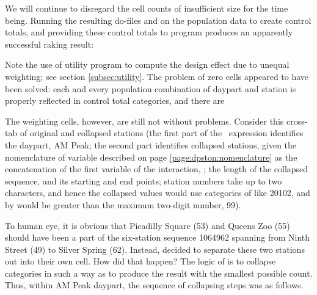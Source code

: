 We will continue to disregard the cell counts of insufficient size for the time being.
Running the resulting do-files  and 
on the population data to create control totals, and providing these control totals
to  program produces an apparently successful raking result:

\noindent
\begin{stlog}
\nullskip
\end{stlog}

Note the use of utility program  to compute the design effect
due to unequal weighting; see section \ref{subsec:utility}. The problem of zero cells
appeared to have been solved: each and every population combination of daypart and station
is properly reflected in control total categories, and there are

The weighting cells, however, are still not without problems. Consider this
cross-tab of original and collapsed stations (the first part of the \ifexp\ expression identifies
the daypart, AM Peak; the second part identifies collapsed stations, given the nomenclature
of  variable described on page \ref{page:dpston:nomenclature} as the concatenation
of the first variable of the interaction, ; the length of the collapsed sequence,
and its starting and end points; station numbers take up to two characters, and hence the collapsed
values would use categories of  like 20102, and  by 
would be greater than the maximum two-digit number, 99).

\begin{stlog}
\nullskip
\end{stlog}

To human eye, it is obvious that Picadilly Square (53) and Queens Zoo (55) should have been
a part of the six-station sequence 1064962 spanning from Ninth Street (49) to Silver Spring (62).
Instead,  decided to separate these two stations out into their own cell.
How did that happen? The logic of  is to collapse categories in such a way
as to produce the result with the smallest possible count. Thus, within AM Peak daypart,
the sequence of collapsing steps was as follows.

